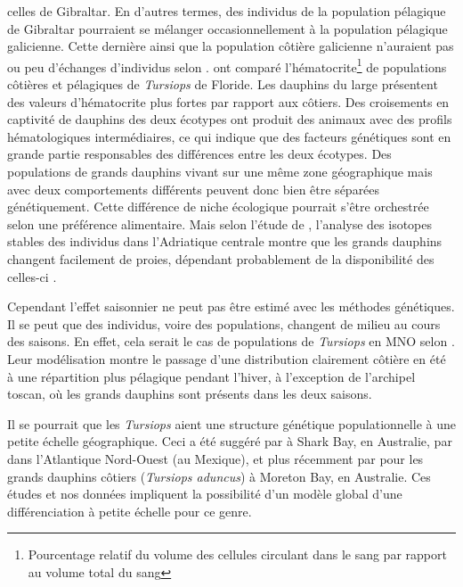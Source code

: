 \documentclass[a4paper,12pt,twoside]{article}\usepackage[]{graphicx}\usepackage[]{color}
\begin{document}
\begin {bibunit} [newbst]
{celles de Gibraltar. En d'autres termes, des individus de la population pélagique de Gibraltar pourraient se mélanger occasionnellement à la population pélagique galicienne. Cette dernière ainsi que la population côtière galicienne n'auraient pas ou peu d'échanges d'individus selon \citet{louis2014}. \citet{duffield1983hematology} ont comparé l'hématocrite\footnote{ Pourcentage relatif du volume des cellules circulant dans le sang par rapport au volume total du sang} de populations côtières et pélagiques de \emph{Tursiops} de Floride. Les dauphins du large présentent des valeurs d'hématocrite plus fortes par rapport aux côtiers. Des croisements en captivité de dauphins des deux écotypes ont produit des animaux avec des profils hématologiques intermédiaires, ce qui indique que des facteurs génétiques sont en grande partie responsables des différences entre les deux écotypes. Des populations de grands dauphins vivant sur une même zone géographique mais avec deux comportements différents peuvent donc bien être séparées génétiquement. Cette différence de niche écologique pourrait s'être orchestrée selon une préférence alimentaire. Mais selon l'étude de \citet{gaspari2015population}, l'analyse des isotopes stables des individus dans l'Adriatique centrale montre que les grands dauphins changent facilement de proies, dépendant probablement de la disponibilité des celles-ci \citep{holcer2012ecology}.

Cependant l'effet saisonnier ne peut pas être estimé avec les méthodes génétiques. Il se peut que des individus, voire des populations, changent de milieu au cours des saisons. En effet, cela serait le cas de populations de \emph{Tursiops} en MNO selon \citep{Laran2016}. Leur modélisation montre le passage d'une distribution clairement côtière en été à une répartition plus pélagique pendant l'hiver, à l'exception de l'archipel toscan, où les grands dauphins sont présents dans les deux saisons.

Il se pourrait que les \emph{Tursiops} aient une structure génétique populationnelle à une petite échelle géographique. Ceci a été suggéré par \citet{krutzen2004population} à Shark Bay, en Australie, par \citet{sellas2005mitochondrial} dans l'Atlantique Nord-Ouest (au Mexique), et plus récemment par \citet{ansmann2012dolphins} pour les grands dauphins côtiers (\emph{Tursiops aduncus}) à Moreton Bay, en Australie. Ces études et nos données impliquent la possibilité d'un modèle global d'une différenciation à petite échelle pour ce genre.

}
\end{bibunit}
\end{document}

